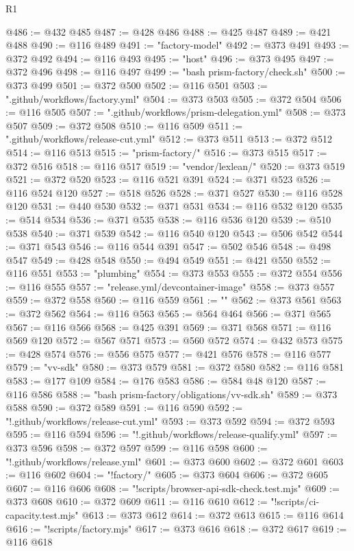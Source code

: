 \begin{lexlean}{R1}
\begin{coremodule}
@486 := @432 @485
@487 := @428 @486
@488 := @425 @487
@489 := @421 @488
@490 := @116 @489
@491 := "factory-model"
@492 := @373 @491
@493 := @372 @492
@494 := @116 @493
@495 := "host"
@496 := @373 @495
@497 := @372 @496
@498 := @116 @497
@499 := "bash prism-factory/check.sh"
@500 := @373 @499
@501 := @372 @500
@502 := @116 @501
@503 := ".github/workflows/factory.yml"
@504 := @373 @503
@505 := @372 @504
@506 := @116 @505
@507 := ".github/workflows/prism-delegation.yml"
@508 := @373 @507
@509 := @372 @508
@510 := @116 @509
@511 := ".github/workflows/release-cut.yml"
@512 := @373 @511
@513 := @372 @512
@514 := @116 @513
@515 := "prism-factory/"
@516 := @373 @515
@517 := @372 @516
@518 := @116 @517
@519 := "vendor/lexlean/"
@520 := @373 @519
@521 := @372 @520
@523 := @116 @521 @391
@524 := @371 @523
@526 := @116 @524 @120
@527 := @518 @526
@528 := @371 @527
@530 := @116 @528 @120
@531 := @440 @530
@532 := @371 @531
@534 := @116 @532 @120
@535 := @514 @534
@536 := @371 @535
@538 := @116 @536 @120
@539 := @510 @538
@540 := @371 @539
@542 := @116 @540 @120
@543 := @506 @542
@544 := @371 @543
@546 := @116 @544 @391
@547 := @502 @546
@548 := @498 @547
@549 := @428 @548
@550 := @494 @549
@551 := @421 @550
@552 := @116 @551
@553 := "plumbing"
@554 := @373 @553
@555 := @372 @554
@556 := @116 @555
@557 := "release.yml/devcontainer-image"
@558 := @373 @557
@559 := @372 @558
@560 := @116 @559
@561 := ""
@562 := @373 @561
@563 := @372 @562
@564 := @116 @563
@565 := @564 @464
@566 := @371 @565
@567 := @116 @566
@568 := @425 @391
@569 := @371 @568
@571 := @116 @569 @120
@572 := @567 @571
@573 := @560 @572
@574 := @432 @573
@575 := @428 @574
@576 := @556 @575
@577 := @421 @576
@578 := @116 @577
@579 := "vv-sdk"
@580 := @373 @579
@581 := @372 @580
@582 := @116 @581
@583 := @177 @109
@584 := @176 @583
@586 := @584 @48 @120
@587 := @116 @586
@588 := "bash prism-factory/obligations/vv-sdk.sh"
@589 := @373 @588
@590 := @372 @589
@591 := @116 @590
@592 := "!.github/workflows/release-cut.yml"
@593 := @373 @592
@594 := @372 @593
@595 := @116 @594
@596 := "!.github/workflows/release-qualify.yml"
@597 := @373 @596
@598 := @372 @597
@599 := @116 @598
@600 := "!.github/workflows/release.yml"
@601 := @373 @600
@602 := @372 @601
@603 := @116 @602
@604 := "!factory/"
@605 := @373 @604
@606 := @372 @605
@607 := @116 @606
@608 := "!scripts/browser-api-sdk-check.test.mjs"
@609 := @373 @608
@610 := @372 @609
@611 := @116 @610
@612 := "!scripts/ci-capacity.test.mjs"
@613 := @373 @612
@614 := @372 @613
@615 := @116 @614
@616 := "!scripts/factory.mjs"
@617 := @373 @616
@618 := @372 @617
@619 := @116 @618

\end{coremodule}
\end{lexlean}
